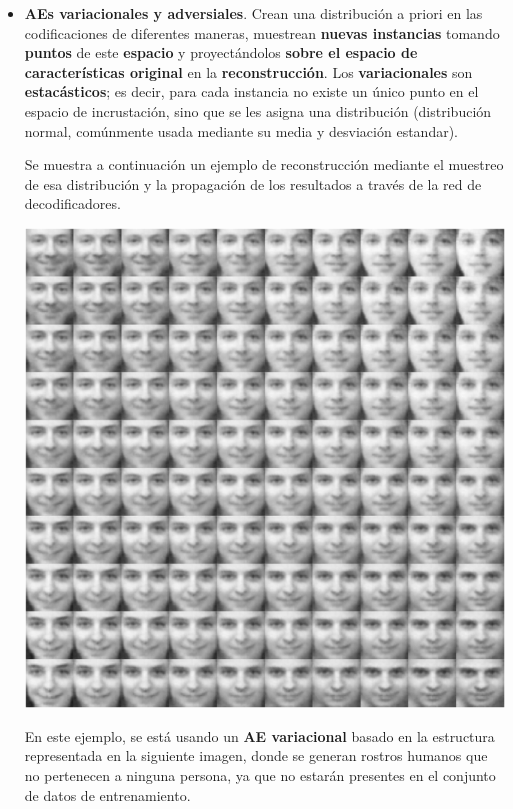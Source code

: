 \begin{enumerate}
\begin{itemize}
        \vspace{5mm}
        \item \textbf{AEs variacionales y adversiales}. Crean una distribución a priori en las codificaciones de diferentes maneras, muestrean \textbf{nuevas instancias} tomando \textbf{puntos} de este \textbf{espacio} y proyectándolos \textbf{sobre el espacio de características original} en la \textbf{reconstrucción}. Los \textbf{variacionales} son \textbf{estacásticos}; es decir, para cada instancia no existe un único punto en el espacio de incrustación, sino que se les asigna una distribución (distribución normal, comúnmente usada mediante su media y desviación estandar).
        
        Se muestra a continuación un ejemplo de reconstrucción mediante el muestreo de esa distribución y la propagación de los resultados a través de la red de decodificadores.
        
        \vspace{5mm}
        \begin{center}
            \includegraphics[width = .6\textwidth]{imagenes/Ejemplos_AE_generativos_caras.png}
        \end{center}
        \vspace{5mm}
        
        \newpage
        En este ejemplo, se está usando un \textbf{AE variacional} basado en la estructura representada en la siguiente imagen, donde se generan rostros humanos que no pertenecen a ninguna persona, ya que no estarán presentes en el conjunto de datos de entrenamiento.
        

\end{itemize}
\end{enumerate}
